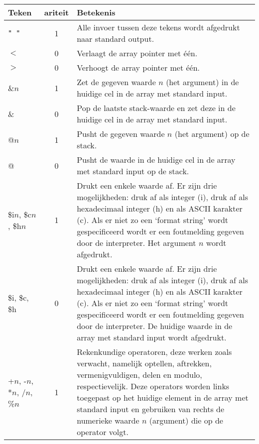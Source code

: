 \documentclass[11pt]{article}
\begin{document}
\begin{center}
    \begin{tabular}{ | l | c | p{12cm} | }
    \hline
    Teken                                   & ariteit & Betekenis \\ \hline
    \verb|" "| & 1                          & Alle invoer tussen deze tekens wordt afgedrukt naar standard output. \\ \hline
    \(<\)                                   & 0 & Verlaagt de array pointer met \'e\'en. \\ \hline
    \(>\)                                   & 0 & Verhoogt de array pointer met \'e\'en. \\ \hline
    \&\(n\)                                 & 1 & Zet de gegeven waarde \(n\) (het argument) in de huidige cel in de array met standard input. \\ \hline
    \&                                      & 0 & Pop de laatste stack-waarde en zet deze in de huidige cel in de array met standard input. \\ \hline
    @\(n\)                                  & 1 & Pusht de gegeven waarde \(n\) (het argument) op de stack. \\ \hline
    @                                       & 0 & Pusht de waarde in de huidige cel in de array met standard input op de stack. \\ \hline
    \$i$n$, \$c$n$, \$h$n$                  & 1 & Drukt een enkele waarde af. Er zijn drie mogelijkheden: druk af als integer (i), druk af als hexadecimaal integer (h) en als ASCII karakter (c). Als er niet zo een `format string' wordt gespecificeerd wordt er een foutmelding gegeven door de interpreter. Het argument \(n\) wordt afgedrukt. \\ \hline
    \$i, \$c, \$h                           & 0 & Drukt een enkele waarde af. Er zijn drie mogelijkheden: druk af als integer (i), druk af als hexadecimaal integer (h) en als ASCII karakter (c). Als er niet zo een `format string' wordt gespecificeerd wordt er een foutmelding gegeven door de interpreter. De huidige waarde in de array met standard input wordt afgedrukt. \\ \hline 
    +\(n\), -\(n\), *\(n\), /\(n\), \%\(n\) & 1 & Rekenkundige operatoren, deze werken zoals verwacht, namelijk optellen, aftrekken, vermenigvuldigen, delen en modulo, respectievelijk. Deze operators worden links toegepast op het huidige element in de array met standard input en gebruiken van rechts de numerieke waarde \(n\) (argument) die op de operator volgt. \\ \hline

\end{tabular}
\end{center}
\end{document}
